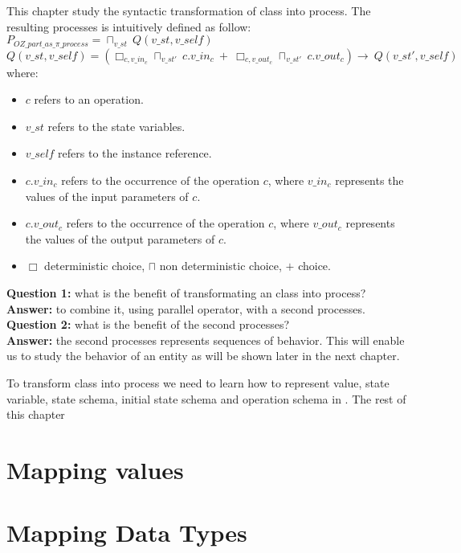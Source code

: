 This chapter study the syntactic transformation of \oz{} class into \picalc{} process. The resulting processes is intuitively defined as follow:\\
$P_{OZ\_part\_as\_\pi\_process} = \sqcap _{v\_st}\ Q(v\_st,v\_self)$\\
$Q(v\_st,v\_self) = (\Box _{c,v\_in_{c}} \sqcap _{v\_st'} \ c.v\_in_{c} \ + \ \Box _{c,v\_out_{c}} \sqcap _{v\_st'} \ c.v\_out_{c})\rightarrow \ Q(v\_st',v\_self)$
where:
\begin{itemize}
\item $c$ refers to an operation.
\item $v\_st$ refers to the state variables.
\item $v\_self$ refers to the instance reference.
\item $c.v\_in_{c}$ refers to the occurrence of the operation $c$, where $v\_in_{c}$ represents the values of the input parameters of $c$.
\item $c.v\_out_{c}$ refers to the occurrence of the operation $c$, where $v\_out_{c}$ represents the values of the output parameters of $c$.
\item $\Box$ deterministic choice, $\sqcap$ non deterministic choice, $+$ choice.
\end{itemize}
\textbf{Question 1:} what is the benefit of transformating an \oz{} class into \picalc{} process?\\
\textbf{Answer:} to combine it, using parallel operator, with a second \picalc{} processes.
\textbf{Question 2:} what is the benefit of the  second processes?\\
\textbf{Answer:} the second processes represents sequences of behavior. This will enable us to study the behavior of an entity as will be shown later in the next chapter.

To transform \oz{} class into \picalc{} process we need to learn how to represent value, state variable, state schema, initial state schema and operation schema in \picalc{}. The rest of this chapter 
\section{Mapping values}
\label{sec_tra_oz_mapping_values}


\section{Mapping Data Types}
\label{sec_tra_oz_mapping_data_types}


